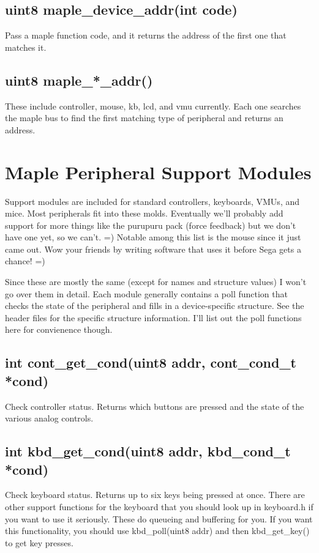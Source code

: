 \documentclass[english]{report}
\begin{document}
\subsection{uint8 maple\_device\_addr(int code)}

Pass a maple function code, and it returns the address of the first
one that matches it. 


\subsection{uint8 maple\_*\_addr()}

These include controller, mouse, kb, lcd, and vmu currently. Each
one searches the maple bus to find the first matching type of peripheral
and returns an address.


\section{Maple Peripheral Support Modules}

Support modules are included for standard controllers, keyboards,
VMUs, and mice. Most peripherals fit into these molds. Eventually
we'll probably add support for more things like the purupuru pack
(force feedback) but we don't have one yet, so we can't. =) Notable
among this list is the mouse since it just came out. Wow your friends
by writing software that uses it before Sega gets a chance! =)

Since these are mostly the same (except for names and structure values)
I won't go over them in detail. Each module generally contains a poll
function that checks the state of the peripheral and fills in a device-specific
structure. See the header files for the specific structure information.
I'll list out the poll functions here for convienence though.


\subsection{int cont\_get\_cond(uint8 addr, cont\_cond\_t *cond)}

Check controller status. Returns which buttons are pressed and the
state of the various analog controls.


\subsection{int kbd\_get\_cond(uint8 addr, kbd\_cond\_t *cond)}

Check keyboard status. Returns up to six keys being pressed at once.
There are other support functions for the keyboard that you should
look up in keyboard.h if you want to use it seriously. These do queueing
and buffering for you. If you want this functionality, you should
use kbd\_poll(uint8 addr) and then kbd\_get\_key() to get key presses.
\end{document}

